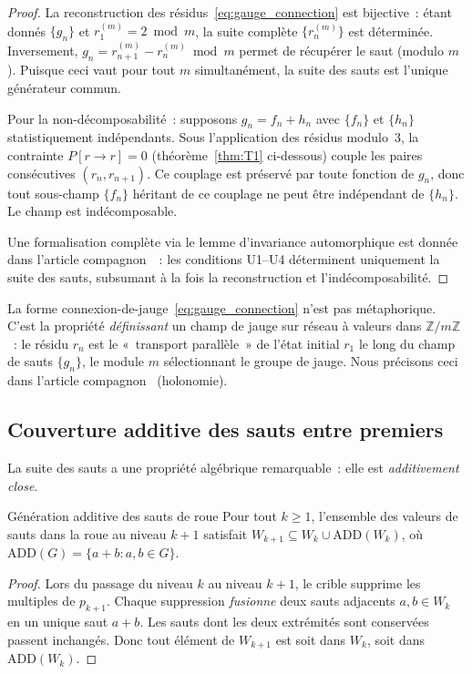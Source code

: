 \documentclass[12pt,a4paper]{article}
\begin{document}
\begin{proof}
La reconstruction des résidus~\eqref{eq:gauge_connection} est
bijective~: étant donnés $\{g_n\}$ et $r_1^{(m)} = 2 \bmod m$, la
suite complète $\{r_n^{(m)}\}$ est déterminée. Inversement,
$g_n = r_{n+1}^{(m)} - r_n^{(m)} \bmod m$ permet de récupérer le saut
(modulo $m$). Puisque ceci vaut pour tout $m$ simultanément, la suite
des sauts est l'unique générateur commun.

Pour la non-décomposabilité~: supposons $g_n = f_n + h_n$ avec
$\{f_n\}$ et $\{h_n\}$ statistiquement indépendants. Sous l'application
des résidus modulo~3, la contrainte $P[r \to r] = 0$
(théorème~\ref{thm:T1} ci-dessous) couple les paires consécutives
$(r_n, r_{n+1})$. Ce couplage est préservé par toute fonction de
$g_n$, donc tout sous-champ $\{f_n\}$ héritant de ce couplage ne peut
être indépendant de $\{h_n\}$. Le champ est indécomposable.

Une formalisation complète via le lemme d'invariance automorphique est
donnée dans l'article compagnon~\cite{companion_M3}~: les conditions
U1--U4 déterminent uniquement la suite des sauts, subsumant à la fois
la reconstruction et l'indécomposabilité.
\end{proof}

\begin{remarque}
La forme connexion-de-jauge~\eqref{eq:gauge_connection} n'est pas
métaphorique. C'est la propriété \emph{définissant} un champ de jauge
sur réseau à valeurs dans $\mathbb{Z}/m\mathbb{Z}$~: le résidu $r_n$
est le «~transport parallèle~» de l'état initial $r_1$ le long du
champ de sauts $\{g_n\}$, le module $m$ sélectionnant le groupe de
jauge. Nous précisons ceci dans l'article
compagnon~\cite{companion_M2} (holonomie).
\end{remarque}

\subsection{Couverture additive des sauts entre premiers}
\label{sec:ch1_coverage}

La suite des sauts a une propriété algébrique remarquable~: elle est
\emph{additivement close}.

\begin{thmbox}{Génération additive des sauts de roue}
\label{thm:wheel_coverage}
Pour tout $k \geq 1$, l'ensemble des valeurs de sauts dans la roue au
niveau $k{+}1$ satisfait
$W_{k+1} \subseteq W_k \cup \mathrm{ADD}(W_k)$,
où $\mathrm{ADD}(G) = \{a + b : a, b \in G\}$.

\begin{proof}
Lors du passage du niveau $k$ au niveau $k{+}1$, le crible supprime
les multiples de $p_{k+1}$. Chaque suppression \emph{fusionne} deux
sauts adjacents $a, b \in W_k$ en un unique saut $a + b$. Les sauts
dont les deux extrémités sont conservées passent inchangés. Donc
tout élément de $W_{k+1}$ est soit dans $W_k$, soit dans
$\mathrm{ADD}(W_k)$.
\end{proof}
\end{thmbox}
\end{document}
